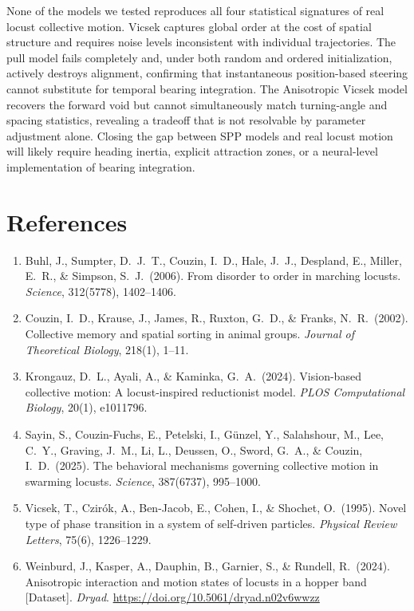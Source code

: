 \documentclass[11pt]{article}
\begin{document}
None of the models we tested reproduces all four statistical signatures of real locust collective motion. Vicsek captures global order at the cost of spatial structure and requires noise levels inconsistent with individual trajectories. The pull model fails completely and, under both random and ordered initialization, actively destroys alignment, confirming that instantaneous position-based steering cannot substitute for temporal bearing integration. The Anisotropic Vicsek model recovers the forward void but cannot simultaneously match turning-angle and spacing statistics, revealing a tradeoff that is not resolvable by parameter adjustment alone. Closing the gap between SPP models and real locust motion will likely require heading inertia, explicit attraction zones, or a neural-level implementation of bearing integration.

\section*{References}
\begin{enumerate}\itemsep=0.2em
\item Buhl, J., Sumpter, D.\ J.\ T., Couzin, I.\ D., Hale, J.\ J., Despland, E., Miller, E.\ R., \& Simpson, S.\ J.\ (2006). From disorder to order in marching locusts. \emph{Science}, 312(5778), 1402--1406.
\item Couzin, I.\ D., Krause, J., James, R., Ruxton, G.\ D., \& Franks, N.\ R.\ (2002). Collective memory and spatial sorting in animal groups. \emph{Journal of Theoretical Biology}, 218(1), 1--11.
\item Krongauz, D.\ L., Ayali, A., \& Kaminka, G.\ A.\ (2024). Vision-based collective motion: A locust-inspired reductionist model. \emph{PLOS Computational Biology}, 20(1), e1011796.
\item Sayin, S., Couzin-Fuchs, E., Petelski, I., G\"unzel, Y., Salahshour, M., Lee, C.\ Y., Graving, J.\ M., Li, L., Deussen, O., Sword, G.\ A., \& Couzin, I.\ D.\ (2025). The behavioral mechanisms governing collective motion in swarming locusts. \emph{Science}, 387(6737), 995--1000.
\item Vicsek, T., Czir\'ok, A., Ben-Jacob, E., Cohen, I., \& Shochet, O.\ (1995). Novel type of phase transition in a system of self-driven particles. \emph{Physical Review Letters}, 75(6), 1226--1229.
\item Weinburd, J., Kasper, A., Dauphin, B., Garnier, S., \& Rundell, R.\ (2024). Anisotropic interaction and motion states of locusts in a hopper band [Dataset]. \emph{Dryad}. \url{https://doi.org/10.5061/dryad.n02v6wwzz}
\end{enumerate}
\end{document}
